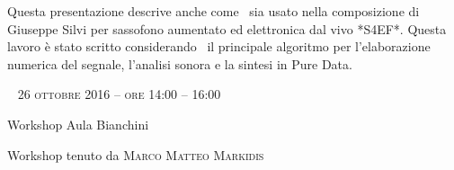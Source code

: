 \begin{flushleft}
Questa presentazione descrive anche come \pa ~sia usato nella composizione di Giuseppe Silvi per sassofono aumentato ed elettronica dal vivo *S4EF*. Questa lavoro \`e stato scritto considerando \pa ~il principale algoritmo per l'elaborazione numerica del segnale, l'analisi sonora e la sintesi in Pure Data. 





~\vfill
\large{
	\scshape{
	26 ottobre 2016 -- ore 14:00 -- 16:00
	}}

\medskip
	
\small{Workshop
	\newline Aula Bianchini}

\medskip

{\fontsize{42}{42} }

\normalfont

\normalsize


\bigskip

Workshop tenuto da \textsc{Marco Matteo Markidis}

\bigskip


\end{flushleft}
